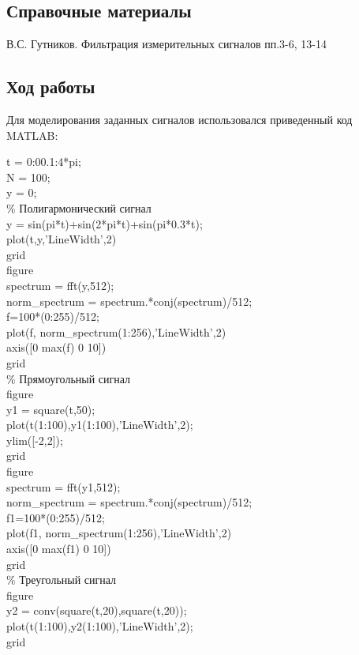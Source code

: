 \documentclass[10pt,a4paper]{article}
\begin{document}
\subsection{Справочные материалы}
В.С. Гутников. Фильтрация измерительных сигналов пп.3-6, 13-14
\subsection{Ход работы}
Для моделирования заданных сигналов использовался приведенный код MATLAB:

\begin{flushleft}
t = 0:00.1:4*pi;\\
N = 100;\\
y = 0;\\

\% Полигармонический сигнал\\
y = sin(pi*t)+sin(2*pi*t)+sin(pi*0.3*t);\\
plot(t,y,'LineWidth',2)\\
grid\\

figure\\
spectrum = fft(y,512);\\
norm\_spectrum = spectrum.*conj(spectrum)/512;\\
f=100*(0:255)/512;\\
plot(f, norm\_spectrum(1:256),'LineWidth',2)\\
axis([0 max(f) 0 10])\\
grid\\

\% Прямоугольный сигнал\\
figure\\
y1 = square(t,50);\\
plot(t(1:100),y1(1:100),'LineWidth',2);\\
ylim([-2,2]);\\
grid\\

figure\\
spectrum = fft(y1,512);\\
norm\_spectrum = spectrum.*conj(spectrum)/512;\\
f1=100*(0:255)/512;\\
plot(f1, norm\_spectrum(1:256),'LineWidth',2)\\
axis([0 max(f1) 0 10])\\
grid\\

\% Треугольный сигнал\\
figure\\
y2 = conv(square(t,20),square(t,20));\\
plot(t(1:100),y2(1:100),'LineWidth',2);\\
grid\\


\end{flushleft}
\end{document}
